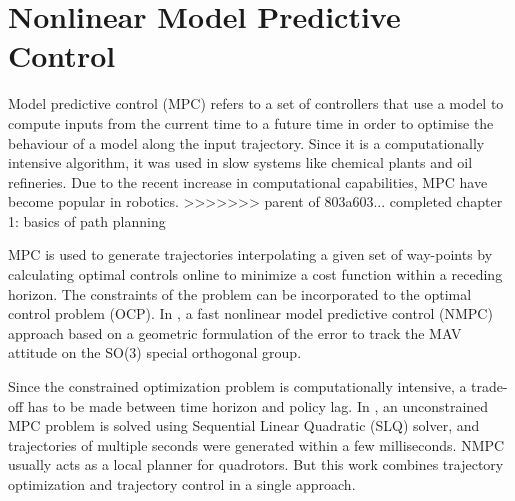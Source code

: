 \section{Nonlinear Model Predictive Control}
Model predictive control (MPC) refers to a set of controllers
that use a model to compute inputs from the current time to
a future time in order to optimise the behaviour of a model
along the input trajectory. Since it is a computationally intensive algorithm, it was used in slow systems like chemical plants and oil refineries. Due to the recent increase in computational capabilities, MPC have become popular in robotics. 
>>>>>>> parent of 803a603... completed chapter 1: basics of path planning

MPC is used to generate trajectories interpolating a given set of way-points \cite{singh2001trajectory} by calculating optimal controls online to minimize a cost function within a receding horizon. The constraints of the problem can be incorporated to the optimal control problem (OCP). In \cite{kamel2015fast}, a fast nonlinear model predictive control (NMPC) approach based on a geometric formulation of the error to track the MAV attitude on the SO(3) special orthogonal group. 

Since the constrained optimization problem is computationally intensive, a trade-off has to be made between time horizon and policy lag. In \cite{neunert2016fast}, an unconstrained MPC problem is solved using Sequential Linear Quadratic (SLQ) solver, and trajectories of multiple seconds were generated within a few milliseconds. NMPC usually acts as a local planner for quadrotors. But this work combines trajectory optimization and trajectory control in a single approach.
















